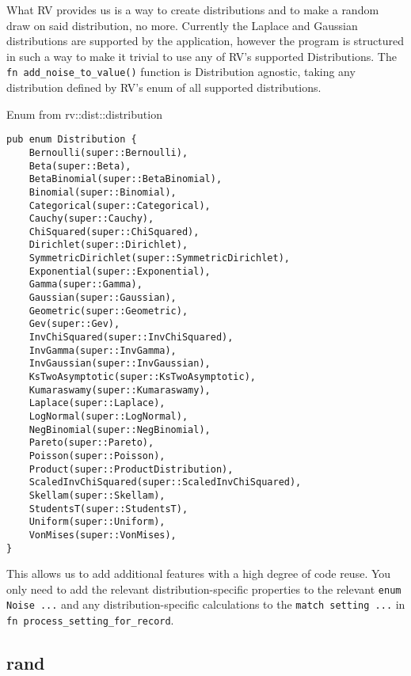 What RV provides us is a way to create distributions and to make a random draw on said distribution, no more. Currently the Laplace and Gaussian distributions are supported by the application, however the program is structured in such a way to make it trivial to use any of RV's supported Distributions. The \texttt{fn add_noise_to_value()} function is Distribution agnostic, taking any distribution defined by RV's enum of all supported distributions.
\begin{listing}[!ht]
\caption{Enum from rv::dist::distribution}
\label{code:rv}
\begin{verbatim}
pub enum Distribution {
    Bernoulli(super::Bernoulli),
    Beta(super::Beta),
    BetaBinomial(super::BetaBinomial),
    Binomial(super::Binomial),
    Categorical(super::Categorical),
    Cauchy(super::Cauchy),
    ChiSquared(super::ChiSquared),
    Dirichlet(super::Dirichlet),
    SymmetricDirichlet(super::SymmetricDirichlet),
    Exponential(super::Exponential),
    Gamma(super::Gamma),
    Gaussian(super::Gaussian),
    Geometric(super::Geometric),
    Gev(super::Gev),
    InvChiSquared(super::InvChiSquared),
    InvGamma(super::InvGamma),
    InvGaussian(super::InvGaussian),
    KsTwoAsymptotic(super::KsTwoAsymptotic),
    Kumaraswamy(super::Kumaraswamy),
    Laplace(super::Laplace),
    LogNormal(super::LogNormal),
    NegBinomial(super::NegBinomial),
    Pareto(super::Pareto),
    Poisson(super::Poisson),
    Product(super::ProductDistribution),
    ScaledInvChiSquared(super::ScaledInvChiSquared),
    Skellam(super::Skellam),
    StudentsT(super::StudentsT),
    Uniform(super::Uniform),
    VonMises(super::VonMises),
}
\end{verbatim}
\end{listing}

This allows us to add additional features with a high degree of code reuse. You only need to add the relevant distribution-specific properties to the relevant \texttt{enum Noise {...}} and any distribution-specific calculations to the \texttt{match setting {...}} in \texttt{fn process_setting_for_record}. 

\subsection{rand}

